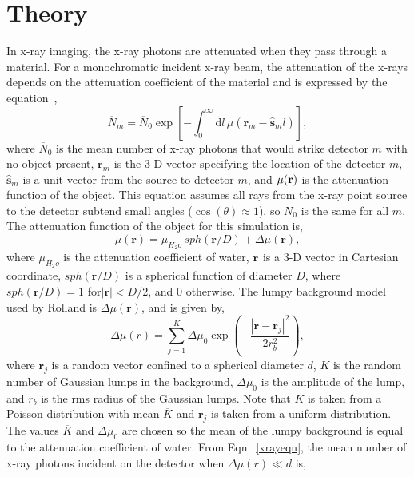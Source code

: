 \section{Theory}
In x-ray imaging, the x-ray photons are attenuated when they pass through a material.  For a monochromatic incident x-ray beam, the attenuation of the x-rays depends on the attenuation coefficient of the material and is expressed by the equation~\citep{Barrett2004},
%
\begin{equation}
\label{xrayeqn}
\overline{N}_m = \overline{N}_0 \exp\left[-\int_0^{\infty} \! \mathrm{d}l \,\mu(\mathbf{r}_{m}-\hat{\mathbf{s}}_m l )\right],
\end{equation}
%
where $\overline{N}_0$ is the mean number of x-ray photons that would strike detector $m$ with no object present, $\mathbf{r}_m$ is the 3-D vector specifying the location of the detector $m$, $\mathbf{\hat{s}}_m$ is a unit vector from the source to detector $m$, and $\mu(\bf{r})$ is the attenuation function of the object.  This equation assumes all rays from the x-ray point source to the detector subtend small angles ($\cos(\theta)\approx 1$), so $\overline{N}_0$ is the same for all $m$.  The attenuation function of the object for this simulation is,
%
\begin{equation}
\label{obj_eqn}
\mu({\mathbf{r}}) = \mu_{H_2o} \, sph(\mathbf{r}/D) + \Delta\mu({\mathbf{r}}), 
\end{equation}
%
where $\mu_{H_2o}$ is the attenuation coefficient of water, $\bf{r}$ is a 3-D vector in Cartesian coordinate, $sph(\textbf{r}/D)$ is a spherical function of diameter $D$, where $sph(\textbf{r}/D)=1$ for$|\textbf{r}|<D/2$, and $0$ otherwise.  The lumpy background model used by Rolland is $\Delta \mu(\textbf{r})$, and is given by,
%
\begin{equation}
\label{lumpy}
\Delta\mu(r) = \sum\limits_{j = 1}^{K}\Delta\mu_0 \exp\left(-\frac{|\mathbf{r}-\mathbf{r}_j|^2}{2r_b^2}   \right),
\end{equation}
%
where $\mathbf{r}_j$ is a random vector confined to a spherical diameter $d$, $K$ is the random number of Gaussian lumps in the background, $\Delta\mu_0$ is the amplitude of the lump, and $r_b$ is the rms radius of the Gaussian lumps.  Note that $K$ is taken from a Poisson distribution with mean $\overline{K}$ and $\mathbf{r}_j$ is taken from a uniform distribution.  The values $\overline{K}$ and $\Delta\mu_0$ are chosen so the mean of the lumpy background is equal to the attenuation coefficient of water.
%
From Eqn.~\ref{xrayeqn}, the mean number of x-ray photons incident on the detector when $\Delta\mu(r) \ll d$ is,
